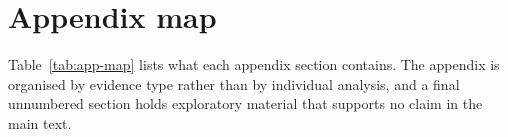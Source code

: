 \documentclass{article}
\begin{document}



\appendix

\newpage



\section*{Appendix map}
\label{app:map}
Table~\ref{tab:app-map} lists what each appendix section contains. The appendix is organised
by evidence type rather than by individual analysis, and a final unnumbered section holds
exploratory material that supports no claim in the main text.
\end{document}
